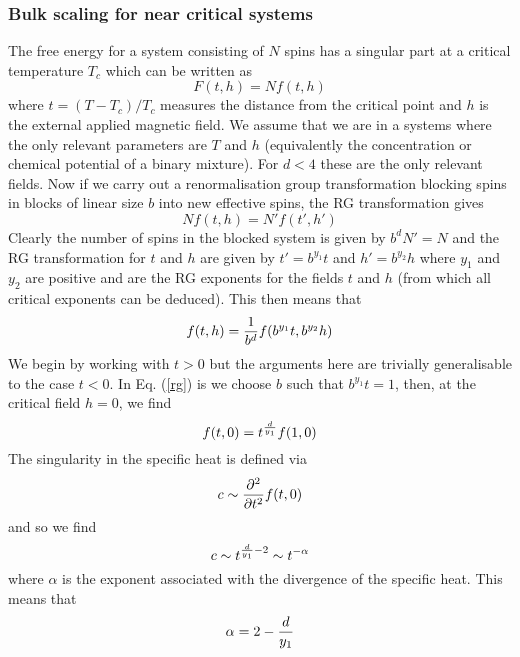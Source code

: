     \subsubsection{Bulk scaling for near critical systems}
The free energy for a system consisting of $N$  spins has a singular part at a critical temperature $T_c$ which can be written as
\begin{equation}
    F(t,h) = N f(t,h)
\end{equation}
where $t = (T-T_c)/ T_c$ measures the distance from the critical point and $h$ is the external applied magnetic field. We assume that we are in a systems where the only relevant parameters are $T$ and $h$ (equivalently the concentration or chemical potential 
of a binary mixture). For $d<4$ these are the only relevant fields.
Now if we carry out a renormalisation group transformation
blocking spins in blocks of linear size $b$ into new effective spins, the RG transformation
gives
\begin{equation}
    N f(t,h) = N'f(t',h')
\end{equation}
Clearly the number of spins in the blocked system is given by $b^d N'=N$ and the RG transformation for $t$ and $h$ are given by $t' = b^{y_1} t$ and $h' = b^{y_2}h$ where $y_1$ and $y_2$ are positive and are the RG exponents for the fields $t$ and $h$ (from which all critical exponents can be deduced). This then means that
\begin{equation}
    f(t,h) = {1\over b^d}f(b^{y_1} t,  b^{y_2} h)\label{rg}
\end{equation}
We begin by working  with $t>0$ but the arguments here are trivially generalisable to the case $t<0$. In Eq. (\ref{rg}) is we choose $b$ such that $b^{y_1}t=1$, then, at the critical field $h=0$, we find
\begin{equation}
    f(t,0) = t^{d\over y_1} f(1,0)
\end{equation}
The singularity in the specific heat is defined via
\begin{equation}
    c\sim {\partial^2 \over \partial t^2}f(t,0)
\end{equation}
and so we find
\begin{equation}
    c\sim t^{{d\over y_1}-2} \sim t^{-\alpha}
\end{equation}
where $\alpha$ is the exponent associated with the divergence of the specific heat. This means that
\begin{equation}
    \alpha = 2 -{d\over y_1}
\end{equation}
